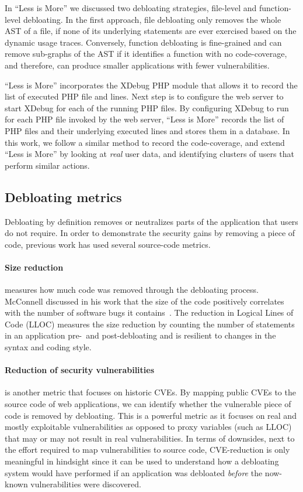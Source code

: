 In ``Less is More'' we discussed two debloating strategies, file-level and function-level debloating. 
In the first approach, file debloating only removes the whole AST of a file, if none of its underlying statements are ever exercised based on the dynamic usage traces. 
Conversely, function debloating is fine-grained and can remove sub-graphs of the AST if it identifies a function with no code-coverage, and therefore, can produce smaller applications with fewer vulnerabilities. 

``Less is More'' incorporates the XDebug PHP module that allows it to record the list of executed PHP file and lines. 
Next step is to configure the web server to start XDebug for each of the running PHP files. 
By configuring XDebug to run for each PHP file invoked by the web server, ``Less is More'' records the list of PHP files and their underlying executed lines and stores them in a database. 
In this work, we follow a similar method to record the code-coverage, and extend ``Less is More'' by looking at \emph{real} user data, and identifying clusters of users that perform similar actions. 

\subsection{Debloating metrics}

Debloating by definition removes or neutralizes parts of the application that users do not require. 
In order to demonstrate the security gains by removing a piece of code, previous work has used several source-code metrics. 

\paragraph{Size reduction} measures how much code was removed through the debloating process. 
McConnell discussed in his work that the size of the code positively correlates with the number of software bugs it contains~\cite{mcconnell2004code}. The reduction in Logical Lines of Code (LLOC) measures the size reduction by counting the number of statements in an application pre-~and post-debloating and is resilient to changes in the syntax and coding style.

\paragraph{Reduction of security vulnerabilities} is another metric that focuses on historic CVEs. 
By mapping public CVEs to the source code of web applications, we can identify whether the vulnerable piece of code is removed by debloating. 
This is a powerful metric as it focuses on real and mostly exploitable vulnerabilities as opposed to proxy variables (such as LLOC) that may or may not result in real vulnerabilities. In terms of downsides, next to the effort required to map vulnerabilities to source code, CVE-reduction is only meaningful in hindsight since it can be used to understand how a debloating system would have performed if an application was debloated \emph{before} the now-known vulnerabilities were discovered. 


